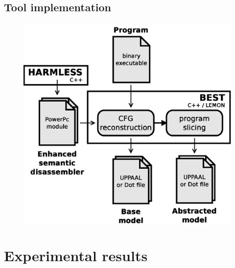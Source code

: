 \documentclass{beamer}
\begin{document}
  \subsection{Tool implementation}
  \begin{frame}
    \frametitle{\secname}
    \framesubtitle{\subsecname}

    \begin{figure}
      \centering
      \includegraphics[height=.85\textheight]{fig/archi.eps}
    \end{figure}
  \end{frame}

  
  \section{Experimental results}
  \begin{frame}
    \frametitle{\secname}
    \tableofcontents[currentsection]
  \end{frame}
  
\end{document}
